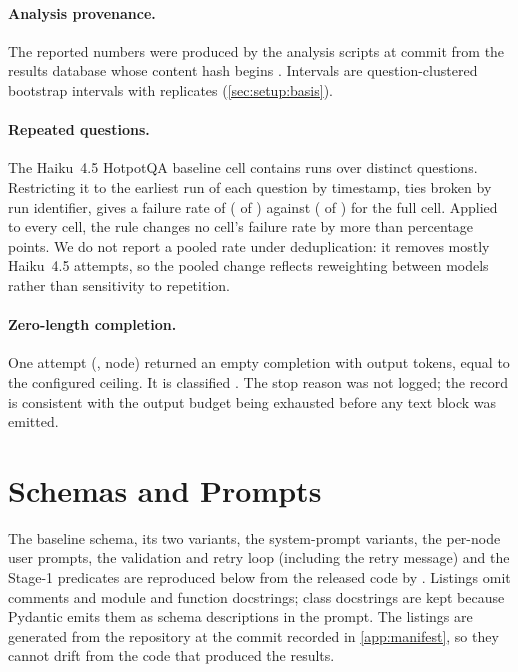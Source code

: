\paragraph{Analysis provenance.}
The reported numbers were produced by the analysis scripts at commit
 from the results database whose content
hash begins . Intervals are question-clustered
bootstrap intervals with  replicates
(\cref{sec:setup:basis}).

\paragraph{Repeated questions.}
The Haiku~4.5 HotpotQA baseline cell contains  runs
over  distinct questions. Restricting it to the
earliest run of each question by timestamp, ties broken by run identifier,
gives a failure rate of 
( of ) against
 ( of
) for the full cell. Applied to every cell, the
rule changes no cell's failure rate by more than
 percentage points. We do not
report a pooled rate under deduplication: it removes mostly Haiku~4.5
attempts, so the pooled change reflects reweighting between models rather
than sensitivity to repetition.

\paragraph{Zero-length completion.}
One attempt (,  node) returned
an empty completion with  output tokens,
equal to the configured ceiling. It is classified . The
stop reason was not logged; the record is consistent with the output
budget being exhausted before any text block was emitted.

\section{Schemas and Prompts}
\label{app:schemas}

The baseline schema, its two variants, the system-prompt variants, the
per-node user prompts, the validation and retry loop (including the retry
message) and the Stage-1 predicates are reproduced below from the released
code by . Listings omit comments and
module and function docstrings; class docstrings are kept because Pydantic
emits them as schema descriptions in the prompt. The listings are
generated from the repository at the commit recorded in
\cref{app:manifest}, so they cannot drift from the code that produced the
results.


